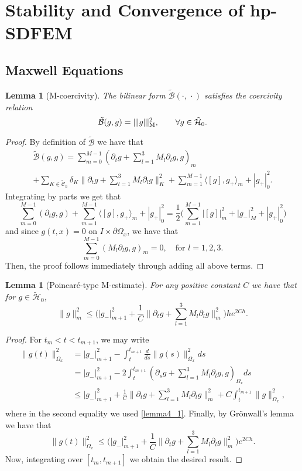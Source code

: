 \documentclass[reqno,a4paper]{amsart}
\newtheorem{lemma}[theorem]{Lemma}
\theoremstyle{remark}
\numberwithin{equation}{section}
\newcommand{\Mnorm}[1]{|\mkern-1mu|\mkern-1mu|#1|\mkern-1mu|\mkern-1mu|_\mathrm{M}}
\newcommand{\sprod}[2]{\langle #1, #2 \rangle}
\def\d{\partial}
\def\Bt{\tilde{\mathcal{B}}}
\def\sumK{\sum_{K\in\mathcal{\tilde{C}}_h}\!\!}
\begin{document}
\section{Stability and Convergence of hp-SDFEM}

\subsection{Maxwell Equations}

\begin{lemma} [M-coercivity]\label{norm}
The bilinear form $\Bt (\cdot,\, \cdot)$ satisfies the coercivity relation
\[
\Bt (g, g) = \Mnorm{g}^2, \qquad \forall g\in \mathcal{\tilde{H}}_0.
\]
\end{lemma}
\begin{proof}
By definition of $ \Bt $ we have that
\begin{multline*}
\Bt (g,g) = \sum_{m=0}^{M-1}(\d_t g +\sum_{l=1}^3 M_l\d_l g, g)_m\\
+ \sumK\delta_K \| \d_t g + \sum_{l=1}^3 M_l\d_l g \|_K^2
+ \sum_{m=1}^{M-1} \sprod{ [ g ]}{g_+}_m + | g_+ |^2_0.
\end{multline*}
Integrating by parts we get that
\[
\sum_{m=0}^{M-1} (\d_t g, g) + \sum_{m=1}^{M-1} \sprod{[g]}{g_+}_m + |g_+|^2_0
= \frac{1}{2} \Big( \sum_{m=1}^{M-1} | [ g ] |^2_m 
+ | g_- |^2_M + | g_+ |^2_0 \Big)
\]
and since $g(t,x)=0$ on $I\times\d\Omega_x$, we have that 
\begin{equation}\label{lemma4_1}
\sum_{m=0}^{M-1} ( M_l\d_l g, g)_m = 0, \quad\mbox{for } l=1,2,3.
\end{equation}
Then, the proof follows immediately through adding all above terms.
\end{proof}

\begin{lemma} [Poincar\'e-type M-estimate]\label{konlem}
For any positive constant $ C $ we have that for 
$ g \in \mathcal{\tilde{H}}_0 $,
\[
\|g\|^2_m \leq \Big(|g_-|^2_{m+1}
+ \frac{1}{C} \|\d_t g + \sum_{l=1}^3 M_l\d_l g\|^2_m \Big) he^{2Ch} .
\]
\end{lemma}
\begin{proof}
For $ t_m < t < t_{m+1} $, we may write
\begin{equation*}
\begin{split}
\|g(t)\|^2_{\Omega_x} &= |g_-|^2_{m+1}-\int_{t}^{t_{m+1}}\frac{d}{ds}
\|g(s)\|^2_{\Omega_x}ds\\
&=|g_-|^2_{m+1}-2\int_{t}^{t_{m+1}}
(\d_s g + \sum_{l=1}^3 M_l\d_l g, g)_{\Omega_x}ds\\
& \leq |g_-|^2_{m+1}+\frac{1}{C}\|\d_t g+\sum_{l=1}^3 M_l\d_l g\|^2_m
+C\int_t^{t_{m+1}}\|g\|^2_{\Omega_x}, \\
\end{split}
\end{equation*}
where in the second equality we used \eqref{lemma4_1}. 
Finally, by Gr\"{o}nwall's lemma we have that
\[
\|g(t)\|^2_{\Omega_x}\leq\Big(|g_-|^2_{m+1}
+\frac{1}{C}\|\d_t g+\sum_{l=1}^3 M_l\d_l g\|^2_m \Big) e^{2Ch}.
\]
Now, integrating over $[t_m,t_{m+1}]$ we obtain the desired result.
\end{proof}
\end{document}
